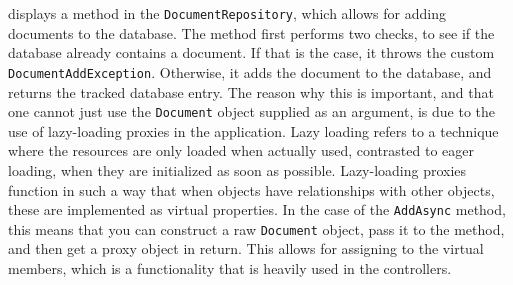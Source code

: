 \documentclass[../../master.tex]{subfiles}
\begin{document}
 displays a method in the \texttt{DocumentRepository}, which allows for adding documents to the database.
The method first performs two checks, to see if the database already contains a document.
If that is the case, it throws the custom \texttt{DocumentAddException}.
Otherwise, it adds the document to the database, and returns the tracked database entry.
The reason why this is important, and that one cannot just use the \texttt{Document} object supplied as an argument, is due to the use of lazy-loading proxies in the application.
Lazy loading refers to a technique where the resources are only loaded when actually used, contrasted to eager loading, when they are initialized as soon as possible.
Lazy-loading proxies function in such a way that when objects have relationships with other objects, these are implemented as virtual properties.
In the case of the \texttt{AddAsync} method, this means that you can construct a raw \texttt{Document} object, pass it to the method, and then get a proxy object in return.
This allows for assigning to the virtual members, which is a functionality that is heavily used in the controllers.

\end{document}
